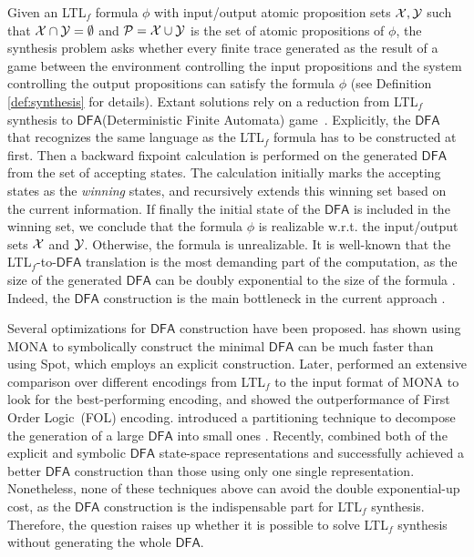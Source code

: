 \documentclass[letterpaper]{article} %
\newcommand{\ltlf}{\textsf{LTL}$_f$\xspace}
\def\dfa{$\mathsf{DFA}$\xspace}
\newcommand{\mona}{{\sf MONA}\xspace}
\newcommand{\spot}{{\sf Spot}\xspace}
\begin{document}
Given an \ltlf formula $\phi$ with input/output atomic proposition sets $\mathcal{X},\mathcal{Y}$ such that $\mathcal{X}\cap \mathcal{Y}=\emptyset$ and $\mathcal{P}=\mathcal{X}\cup\mathcal{Y}$ is the set of atomic propositions of $\phi$, the synthesis problem asks whether every finite trace generated as the result of a game between the environment controlling the input propositions and the system controlling the output propositions can satisfy the formula $\phi$ (see Definition \ref{def:synthesis} for details). Extant solutions rely on a reduction from \ltlf synthesis to \dfa (Deterministic Finite Automata) game~\citep{GV15}. Explicitly, the \dfa that recognizes the same language as the \ltlf formula has to be constructed at first. Then a backward fixpoint calculation is performed on the generated \dfa from the set of accepting states. The calculation initially marks the accepting states as the \emph{winning} states, and recursively extends this winning set based on the current information. If finally the initial state of the \dfa is included in the winning set, we conclude that the formula $\phi$ is realizable w.r.t. the input/output sets $\mathcal{X}$ and $\mathcal{Y}$. Otherwise, the formula is unrealizable. It is well-known that the \ltlf-to-\dfa translation is the most demanding part of the computation, as the size of the generated \dfa can be doubly exponential to the size of the formula \citep{KV01d}. Indeed, the \dfa construction is the main bottleneck in the current approach \cite{ZTLPV17}.

Several optimizations for \dfa construction have been proposed. \citep{ZTLPV17} has shown using \mona \citep{HJJKPRS95,EKM98} to symbolically construct the minimal \dfa can be much faster than using \spot \citep{DP04}, which employs an explicit construction. Later, \citep{ZhuPV19} performed an extensive comparison over different encodings from \ltlf to the input format of \mona to look for the best-performing encoding, and showed the outperformance of First Order Logic~(FOL) encoding. \citep{TV19} introduced a partitioning technique to decompose the generation of a large \dfa into small ones \citep{MSL18}. Recently, \citep{BLTV20} combined both of the explicit and symbolic \dfa state-space representations and successfully achieved a better \dfa construction than those using only one single representation. Nonetheless, none of these techniques above can avoid the double exponential-up cost, as the \dfa construction is the indispensable part for \ltlf synthesis. Therefore, the question raises up whether it is possible to solve \ltlf synthesis without generating the whole \dfa.
\end{document}
